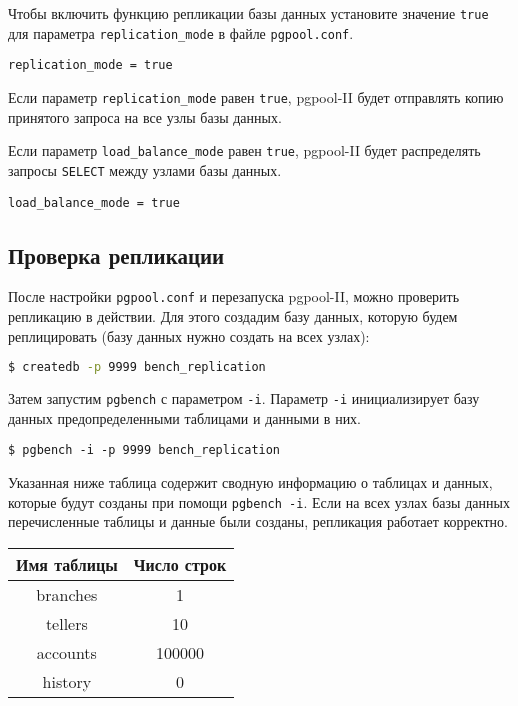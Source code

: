Чтобы включить функцию репликации базы данных установите значение \lstinline!true! для параметра \lstinline!replication_mode! в файле \lstinline!pgpool.conf!.

\begin{lstlisting}[label=lst:pgpool17,caption=Настройка репликации]
replication_mode = true
\end{lstlisting}

Если параметр \lstinline!replication_mode! равен \lstinline!true!, pgpool-II будет отправлять копию принятого запроса на все узлы базы данных.

Если параметр \lstinline!load_balance_mode! равен \lstinline!true!, pgpool-II будет распределять запросы \lstinline!SELECT! между узлами базы данных.

\begin{lstlisting}[label=lst:pgpool18,caption=Настройка репликации]
load_balance_mode = true
\end{lstlisting}

\subsection{Проверка репликации}

После настройки \lstinline!pgpool.conf! и перезапуска pgpool-II, можно проверить репликацию в действии. Для этого создадим базу данных, которую будем реплицировать (базу данных нужно создать на всех узлах):

\begin{lstlisting}[language=Bash,label=lst:pgpool19,caption=Проверка репликации]
$ createdb -p 9999 bench_replication
\end{lstlisting}

Затем запустим \lstinline!pgbench! с параметром \lstinline!-i!. Параметр \lstinline!-i! инициализирует базу данных предопределенными таблицами и данными в них.

\begin{lstlisting}[label=lst:pgpool20,caption=Проверка репликации]
$ pgbench -i -p 9999 bench_replication
\end{lstlisting}

Указанная ниже таблица содержит сводную информацию о таблицах и данных, которые будут созданы при помощи \lstinline!pgbench -i!. Если на всех узлах базы данных перечисленные таблицы и данные были созданы, репликация работает корректно.

\begin{tabular}{ | c | c | }
  \hline
  Имя таблицы & Число строк \\
  \hline
  branches & 1 \\
  \hline
  tellers & 10 \\
  \hline
  accounts & 100000 \\
  \hline
  history & 0 \\
  \hline
\end{tabular}

